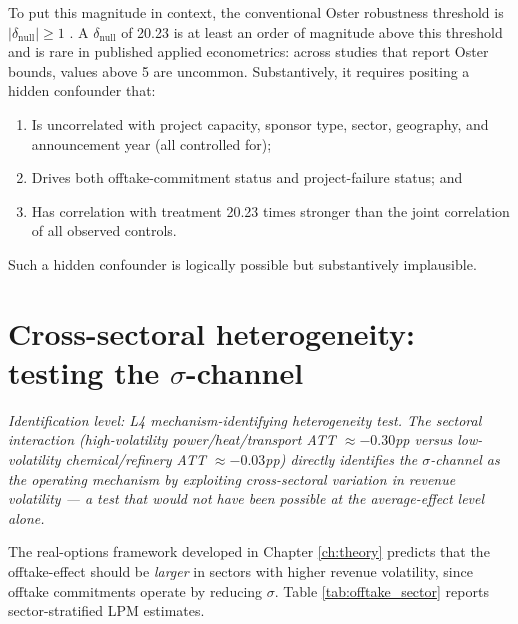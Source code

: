 To put this magnitude in context, the conventional Oster robustness threshold is $|\delta_{\text{null}}| \geq 1$ \cite{oster2019unobservable}. A $\delta_{\text{null}}$ of 20.23 is at least an order of magnitude above this threshold and is rare in published applied econometrics: across studies that report Oster bounds, values above 5 are uncommon. Substantively, it requires positing a hidden confounder that:
\begin{enumerate}
\item Is uncorrelated with project capacity, sponsor type, sector, geography, and announcement year (all controlled for);
\item Drives both offtake-commitment status and project-failure status; and
\item Has correlation with treatment 20.23 times stronger than the joint correlation of all observed controls.
\end{enumerate}
Such a hidden confounder is logically possible but substantively implausible.

\section{Cross-sectoral heterogeneity: testing the $\sigma$-channel}
\noindent\emph{Identification level: L4 mechanism-identifying heterogeneity test. The sectoral interaction (high-volatility power/heat/transport ATT $\approx -0.30$pp versus low-volatility chemical/refinery ATT $\approx -0.03$pp) directly identifies the $\sigma$-channel as the operating mechanism by exploiting cross-sectoral variation in revenue volatility — a test that would not have been possible at the average-effect level alone.}

\label{sec:offtake_sectoral}

The real-options framework developed in Chapter \ref{ch:theory} predicts that the offtake-effect should be \emph{larger} in sectors with higher revenue volatility, since offtake commitments operate by reducing $\sigma$. Table \ref{tab:offtake_sector} reports sector-stratified LPM estimates.

